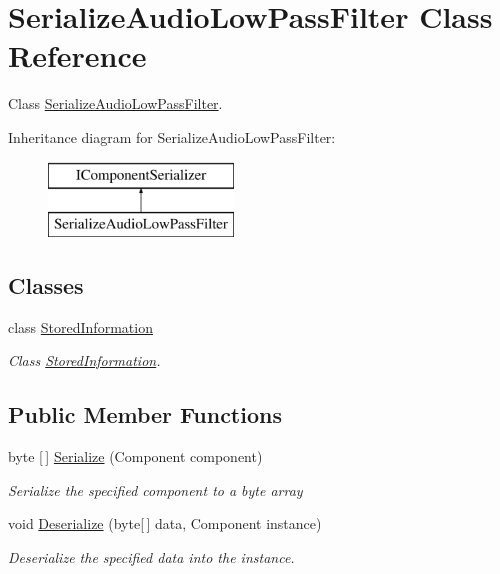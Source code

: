 \hypertarget{class_serialize_audio_low_pass_filter}{}\section{Serialize\+Audio\+Low\+Pass\+Filter Class Reference}
\label{class_serialize_audio_low_pass_filter}


Class \hyperlink{class_serialize_audio_low_pass_filter}{Serialize\+Audio\+Low\+Pass\+Filter}.  


Inheritance diagram for Serialize\+Audio\+Low\+Pass\+Filter\+:\begin{figure}[H]
\begin{center}
\leavevmode
\includegraphics[height=2.000000cm]{class_serialize_audio_low_pass_filter}
\end{center}
\end{figure}
\subsection*{Classes}
\begin{DoxyCompactItemize}
\item 
class \hyperlink{class_serialize_audio_low_pass_filter_1_1_stored_information}{Stored\+Information}
\begin{DoxyCompactList}\small\item\em Class \hyperlink{class_serialize_audio_low_pass_filter_1_1_stored_information}{Stored\+Information}. \end{DoxyCompactList}\end{DoxyCompactItemize}
\subsection*{Public Member Functions}
\begin{DoxyCompactItemize}
\item 
byte \mbox{[}$\,$\mbox{]} \hyperlink{class_serialize_audio_low_pass_filter_a3c3f8b730af67936ec7ddc4f318bd1c0}{Serialize} (Component component)
\begin{DoxyCompactList}\small\item\em Serialize the specified component to a byte array \end{DoxyCompactList}\item 
void \hyperlink{class_serialize_audio_low_pass_filter_a041864b6e0b1f1a8bab893b5243ad880}{Deserialize} (byte\mbox{[}$\,$\mbox{]} data, Component instance)
\begin{DoxyCompactList}\small\item\em Deserialize the specified data into the instance. \end{DoxyCompactList}\end{DoxyCompactItemize}


